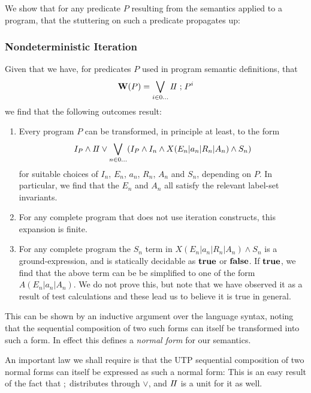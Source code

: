 We show that for any predicate $P$ resulting from the
semantics applied to a program,
that the stuttering on such a predicate propagates up:



\subsubsection{Nondeterministic Iteration}

Given that we have,
for predicates $P$ used in program semantic definitions,
that
\[
  \mathbf{W}(P) = \bigvee_{i \in 0\dots} I\!I \mathrel{;} P^i
\]
we find that the following outcomes result:
\begin{enumerate}
  \item
    Every program $P$ can be transformed,
    in principle at least,
    to the form
    \[
      I_P \land I\!I
      \lor
      \bigvee_{n \in 0\dots}  (I_P \land I_n \land X(E_n|a_n|R_n|A_n) \land S_n)
    \]
    for suitable choices of $I_n$, $E_n$, $a_n$, $R_n$, $A_n$ and $S_n$,
    depending on $P$.
    In particular, we find that the $E_n$ and $A_n$ all satisfy the relevant
    label-set invariants.
  \item
    For any complete program that does not use iteration constructs,
    this expansion is finite.
  \item
    For any complete program the $S_n$
    term in $X(E_n|a_n|R_n|A_n) \land S_n$
    is a ground-expression, and is statically decidable as $\mathbf{true}$ or $\mathbf{false}$.
    If $\mathbf{true}$, we find that the above term
    can be be simplified to one of the form $A(E_n|a_n|A_n)$.
    We do not prove this, but note that we have observed it as a result
    of test calculations and these lead us to believe it is true in general.
\end{enumerate}
This can be shown by an inductive argument over the language syntax,
noting that the sequential composition of two such forms
can itself be transformed into such a form.
In effect this defines a \emph{normal form} for our semantics.


An important law we shall require is that the UTP sequential
composition of two normal forms can itself be expressed
as such a normal form:
This is an easy result of the fact that $\mathrel{;}$ distributes through $\lor$,
and $I\!I$ is a unit for it as well.


